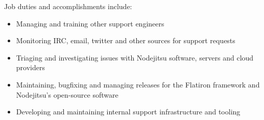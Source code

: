 \normalsize
Job duties and accomplishments include:
\small
\begin{itemize}
    \item Managing and training other support engineers
    \item Monitoring IRC, email, twitter and other sources for support requests
    \item Triaging and investigating issues with Nodejitsu software, servers and cloud providers
    \item Maintaining, bugfixing and managing releases for the Flatiron framework and Nodejitsu's open-source software
    \item Developing and maintaining internal support infrastructure and tooling
\end{itemize}
\normalsize
\medskip
